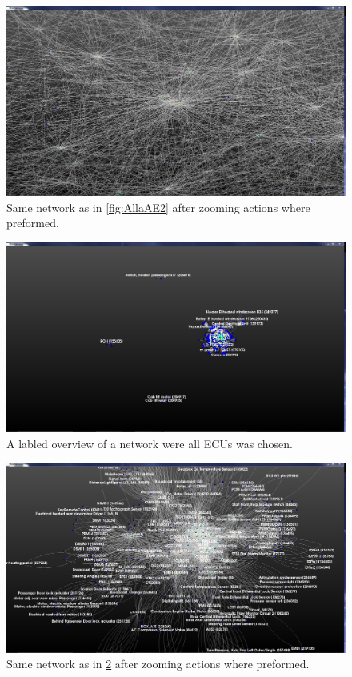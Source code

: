 \documentclass[a4paper,11pt]{kth-mag}
\begin{document}
\newpage
\begin{figure}[!htbp]
	\centering
	\includegraphics[scale=0.3]{SesammVisualAppPics/2D-View/Unlabled/AE/AllaAE4}
	\caption{Same network as in \ref{fig:AllaAE2} after zooming actions where preformed.}
	\label{fig:AllaAE4}
\end{figure}

\begin{figure}[!htbp]
	\centering
	\includegraphics[scale=0.3]{SesammVisualAppPics/2D-View/Labled/ECU/AllaECU1}
	\caption{A labled overview of a network were all ECUs was chosen.}
	\label{fig:AllaECU1TwoD}
\end{figure}

\begin{figure}[!htbp]
	\centering
	\includegraphics[scale=0.3]{SesammVisualAppPics/2D-View/Labled/ECU/AllaECU3}
	\caption{Same network as in \ref{fig:AllaECU1TwoD} after zooming actions where preformed.}
	\label{fig:AllaECU3TwoD}
\end{figure}
\end{document}

